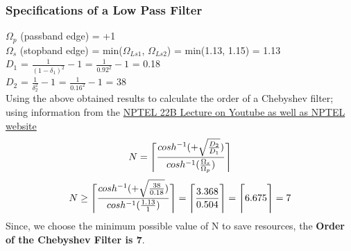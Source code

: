 \documentclass{article}
\DeclarePairedDelimiter{\ceil}{\lceil}{\rceil}
\begin{document}
\subsubsection{Specifications of a Low Pass Filter}
$\Omega_p$ (passband edge) = +1\\
$\Omega_s$ (stopband edge) = min($\Omega_{Ls1}$, $\Omega_{Ls2}$) = min(1.13, 1.15) = 1.13\\
$D_1$ = $\frac{1}{(1-\delta_1)^2} - 1$ = $\frac{1}{0.92^2} - 1$ = 0.18\\
$D_2$ = $\frac{1}{\delta_2^2} - 1$ = $\frac{1}{0.16^2} - 1$ = 38\\
Using the above obtained results to calculate the order of a Chebyshev filter; using information from the \href{https://youtu.be/lM7oEy2s8Fw}{NPTEL 22B Lecture on Youtube as well as NPTEL website}\\
\[
    N = \ceil[\Bigg]{\frac{cosh^{-1}(+\sqrt{\frac{D_2}{D_1}})}{cosh^{-1}(\frac{\Omega_s}{\Omega_p})}}
\]
\[
    N \geq \ceil[\Bigg]{\frac{cosh^{-1}(+\sqrt{\frac{38}{0.18}})}{cosh^{-1}(\frac{1.13}{1})}} = \ceil[\Bigg]{\frac{3.368}{0.504}} = \ceil[\Bigg]{6.675} = 7
\]
Since, we choose the minimum possible value of N to save resources, the \textbf{Order of the Chebyshev Filter is 7}.
\end{document}
